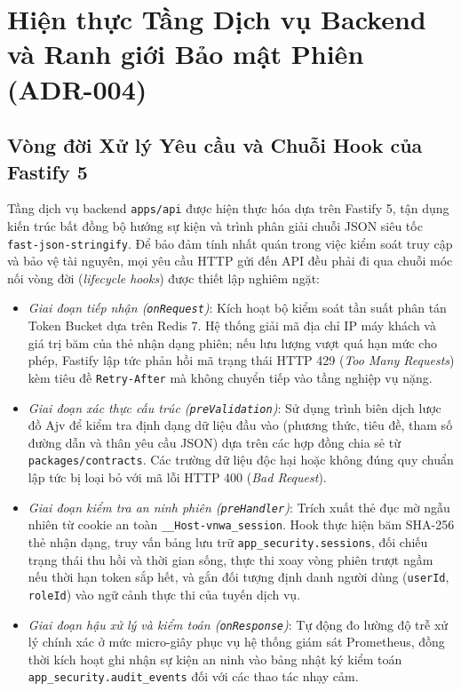 \section{Hiện thực Tầng Dịch vụ Backend và Ranh giới Bảo mật Phiên (ADR-004)}
\label{sec:backend_fastify_impl}

\subsection{Vòng đời Xử lý Yêu cầu và Chuỗi Hook của Fastify 5}
Tầng dịch vụ backend \texttt{apps/api} được hiện thực hóa dựa trên Fastify 5, tận dụng kiến trúc bất đồng bộ hướng sự kiện và trình phân giải chuỗi JSON siêu tốc \texttt{fast-json-stringify}. Để bảo đảm tính nhất quán trong việc kiểm soát truy cập và bảo vệ tài nguyên, mọi yêu cầu HTTP gửi đến API đều phải đi qua chuỗi móc nối vòng đời (\textit{lifecycle hooks}) được thiết lập nghiêm ngặt:
\begin{itemize}
    \item[-] \textit{Giai đoạn tiếp nhận (\texttt{onRequest})}: Kích hoạt bộ kiểm soát tần suất phân tán Token Bucket dựa trên Redis 7. Hệ thống giải mã địa chỉ IP máy khách và giá trị băm của thẻ nhận dạng phiên; nếu lưu lượng vượt quá hạn mức cho phép, Fastify lập tức phản hồi mã trạng thái HTTP 429 (\textit{Too Many Requests}) kèm tiêu đề \texttt{Retry-After} mà không chuyển tiếp vào tầng nghiệp vụ nặng.
    \item[-] \textit{Giai đoạn xác thực cấu trúc (\texttt{preValidation})}: Sử dụng trình biên dịch lược đồ Ajv để kiểm tra định dạng dữ liệu đầu vào (phương thức, tiêu đề, tham số đường dẫn và thân yêu cầu JSON) dựa trên các hợp đồng chia sẻ từ \texttt{packages/contracts}. Các trường dữ liệu độc hại hoặc không đúng quy chuẩn lập tức bị loại bỏ với mã lỗi HTTP 400 (\textit{Bad Request}).
    \item[-] \textit{Giai đoạn kiểm tra an ninh phiên (\texttt{preHandler})}: Trích xuất thẻ đục mờ ngẫu nhiên từ cookie an toàn \texttt{\_\_Host-vnwa\_session}. Hook thực hiện băm SHA-256 thẻ nhận dạng, truy vấn bảng lưu trữ \texttt{app\_security.sessions}, đối chiếu trạng thái thu hồi và thời gian sống, thực thi xoay vòng phiên trượt ngầm nếu thời hạn token sắp hết, và gắn đối tượng định danh người dùng (\texttt{userId}, \texttt{roleId}) vào ngữ cảnh thực thi của tuyến dịch vụ.
    \item[-] \textit{Giai đoạn hậu xử lý và kiểm toán (\texttt{onResponse})}: Tự động đo lường độ trễ xử lý chính xác ở mức micro-giây phục vụ hệ thống giám sát Prometheus, đồng thời kích hoạt ghi nhận sự kiện an ninh vào bảng nhật ký kiểm toán \texttt{app\_security.audit\_events} đối với các thao tác nhạy cảm.
\end{itemize}


